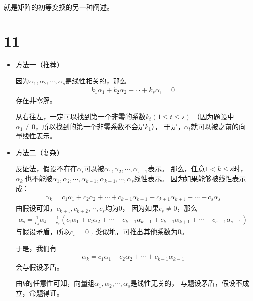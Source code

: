 \documentclass{article}
\begin{document}
就是矩阵的初等变换的另一种阐述。

\section*{11}

\begin{itemize}
  \item 方法一（推荐）

        因为$\alpha_1, \alpha_2, \cdots, \alpha_s$是线性相关的，那么
        \begin{align*}
          k_1 \alpha_1 + k_2 \alpha_2 + \cdots + k_s \alpha_s = 0
        \end{align*}
        存在非零解。

        从右往左，一定可以找到第一个非零的系数$k_t (1 \leq t \leq s)$
        （因为题设中$\alpha_1 \neq 0$，所以找到的第一个非零系数不会是$k_1$），
        于是，$\alpha_t$就可以被之前的向量线性表示。

  \item 方法二（复杂）

        反证法，假设不存在$\alpha_i$可以被$\alpha_1, \alpha_2, \cdots, \alpha_{i - 1}$表示。
        那么，任意$1 < k \leq s$时，$\alpha_{k}$
        也不能被$\alpha_1, \alpha_2, \cdots, \alpha_{k - 1}, \alpha_{k + 1}, \cdots, \alpha_s$线性表示。
        因为如果能够被线性表示成：
        \begin{align*}
          \alpha_{k} = c_1 \alpha_1 + c_2\alpha_2 + \cdots + c_{k - 1}\alpha_{k - 1} + c_{k + 1} \alpha_{k + 1} + \cdots + c_s \alpha_s
        \end{align*}
        由假设可知，$c_{k + 1}, c_{k + 2}, \cdots, c_s$均为0，
        因为如果$c_s \neq 0$，那么
        \begin{align*}
          \alpha_s = \frac{1}{c_s} \alpha_{k} - \frac{1}{c_s} (c_1 \alpha_1 + c_2\alpha_2 + \cdots + c_{k - 1}\alpha_{k - 1} + c_{k + 1} \alpha_{k + 1} + \cdots + c_{s-1} \alpha_{s - 1})
        \end{align*}
        与假设矛盾，所以$c_s = 0$；类似地，可推出其他系数为$0$。

        于是，我们有
        \begin{align*}
          \alpha_{k} = c_1 \alpha_1 + c_2\alpha_2 + \cdots + c_{k - 1}\alpha_{k - 1}
        \end{align*}
        会与假设矛盾。

        由$k$的任意性可知，向量组$\alpha_1, \alpha_2, \cdots, \alpha_s$是线性无关的，
        与题设矛盾，假设不成立，命题得证。
\end{itemize}
\end{document}
